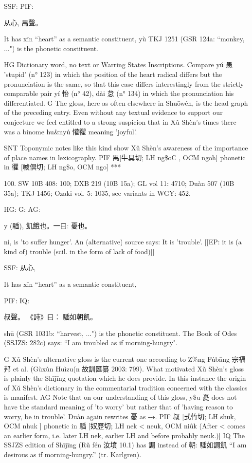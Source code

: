 SSF: PIF:

从心, 禺聲。

It has xīn ``heart'' as a semantic constituent,
yù TKJ 1251 (GSR 124a: ``monkey, ...") is the phonetic constituent.

HG Dictionary word, no text or Warring States Inscriptions. Compare yú 愚 'stupid' (n° 123) in which the position of the heart radical differs but the pronunciation is the same, so that this case differs interestingly from the strictly comparable pair yí 怡 (n° 42), dài 怠 (n° 134) in which the pronunciation his differentiated.
G The gloss, here as often elsewhere in Shuōwén, is the head graph of the preceding entry. Even without any textual evidence to support our conjecture we feel entitled to a strong suspicion that in Xǔ Shèn's times there was a binome hu&nyú 懽忂 meaning 'joyful'.



SNT Toponymic notes like this kind show Xǔ Shèn's awareness of the importance of place names in lexicography.
PIF     禺[牛具切; LH ng\$oC , OCM ngoh] phonetic in 忂 [噳倶切; LH ng\$o, OCM ngo]
***

100. SW 10B 408: 100; DXB 219 (10B 15a); GL vol 11: 4710; Duàn 507 (10B 35a); TKJ 1456; Ozaki vol. 5: 1035, see
variants in WGY: 452.


HG:
G:
AG:

y (䮢), 飢餓也。一曰:
憂也。


nì,
is 'to suffer hunger'.
An (alternative) source says:
It is 'trouble'. [[EP: it is (a kind of) trouble (scil. in the form of lack of food)]]

SSF: 从心,

It has xīn ``heart'' as a semantic constituent,

PIF: IQ:

叔聲。
《詩》曰： 䮢如朝飢。

shū (GSR 1031b: ``harvest, ...") is the phonetic constituent.
The Book of Odes (SSJZS: 282c) says: ``I am troubled as if morning-hungry".

G Xǔ Shèn's alternative gloss is the current one according to Z\%ng Fúbāng 宗福邦 et al. (Gùxùn Huìzu(n 故訓匯纂 2003: 799). What motivated Xǔ Shèn's gloss is plainly the Shījīng quotation which he does provide. In this instance the origin of Xǔ Shèn's dictionary in the commentarial tradition concerned with the classics is manifest.
AG Note that on our understanding of this gloss, y\$u 憂 does not have the standard meaning of 'to worry' but rather that of 'having reason to worry, be in trouble'.
Duàn again rewrites 憂 as ⤏.
PIF 叔 [式竹切; LH shuk, OCM nhuk ] phonetic in 䮢 [奴歷切; LH nek < neuk, OCM niûk (After < comes an earlier form, i.e. later LH nek, earlier LH and before probably neuk.)]
IQ The SSJZS edition of Shījīng (Rǔ fén 汝墳 10.1) has 調 instead of 朝: 䮢如調飢 ``I am desirous as if morning-hungry.'' (tr. Karlgren).


